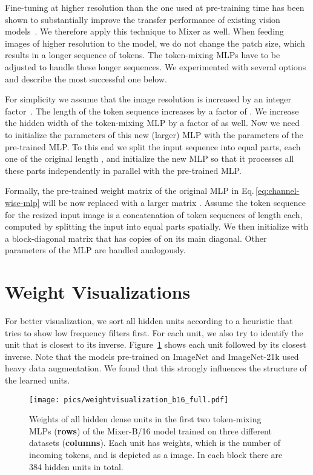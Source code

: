 \documentclass{article}
\newcommand{\name}{Mixer}
\begin{document}
Fine-tuning at higher resolution than the one used at pre-training time has been shown to substantially improve the transfer performance of existing vision models~\citep{touvron2019,kolesnikov2020-bit,Dosovitskiy2021}.
We therefore apply this technique to \name{} as well. 
When feeding images of higher resolution to the model, we do not change the patch size, which results in a longer sequence of tokens.
The token-mixing MLPs have to be adjusted to handle these longer sequences.
We experimented with several options and describe the most successful one below.

For simplicity we assume that the image resolution is increased by an integer factor~.
The length  of the token sequence increases by a factor of .
We increase the hidden width  of the token-mixing MLP by a factor of  as well.
Now we need to initialize the parameters of this new (larger) MLP with the parameters of the pre-trained MLP.
To this end we split the input sequence into  equal parts, each one of the original length , and initialize the new MLP so that it processes all these parts independently in parallel with the pre-trained MLP.

Formally, the pre-trained weight matrix  of the original MLP in Eq.\,\ref{eq:channel-wise-mlp}
will be now replaced with a larger matrix .
Assume the token sequence for the resized input image is a concatenation of  token sequences of length  each, computed by splitting the input into  equal parts spatially.
We then initialize  with a block-diagonal matrix that has copies of  on its main diagonal.
Other parameters of the MLP are handled analogously.

\section{Weight Visualizations}\label{sec:app:weightvisualizations}
For better visualization, we sort all hidden units according to a heuristic that tries to show low frequency filters first.
For each unit, we also try to identify the unit that is closest to its inverse. Figure~\ref{fig:weight-plots-full} shows each unit followed by its closest inverse.
Note that the models pre-trained on ImageNet and ImageNet-21k used heavy data augmentation.
We found that this strongly influences the structure of the learned units.

\begin{figure}[t]
    \texttt{[image: pics/weightvisualization\_b16\_full.pdf]}
    \caption{Weights of all hidden dense units in the first two token-mixing MLPs ({\bf rows}) of the \name{}-B/16 model trained on three different datasets ({\bf columns}). 
    Each unit has  weights, which is the number of incoming tokens, and is depicted as a  image.
    In each block there are 384 hidden units in total.
    }
  \label{fig:weight-plots-full}
\end{figure}
\end{document}
